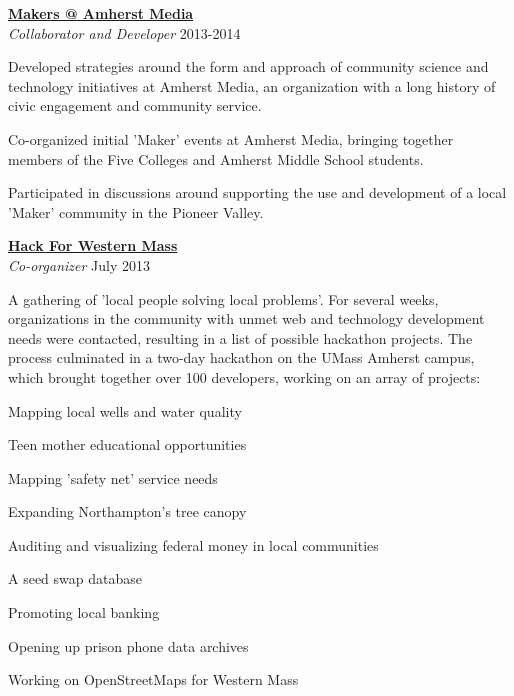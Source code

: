 \documentclass[10pt]{article}
\newcommand{\blankline}{\quad\pagebreak[3]}
\newcommand{\halfblankline}{\quad\vspace{-0.5\baselineskip}\pagebreak[3]}
\begin{document}
\blankline


\href{http://www.amherstmedia.org/makers}{\textbf{Makers @ Amherst Media}}\\
\emph{Collaborator and Developer} \hfill {2013-2014}

\halfblankline

\begin{innerlist}
\item Developed strategies around the form and approach of community science and technology initiatives at Amherst Media, an organization with a long history of civic engagement and community service. 
\item Co-organized initial 'Maker' events at Amherst Media, bringing together members of the Five Colleges and Amherst Middle School students.
\item Participated in discussions around supporting the use and development of a local 'Maker' community in the Pioneer Valley.
\end{innerlist}  

\blankline


\href{http://hackforwesternmass.org/}{\textbf{Hack For Western Mass}} \\
\emph{Co-organizer} \hfill {July 2013} 

\halfblankline

A gathering of 'local people solving local problems'. For several weeks, organizations in the community with unmet web and technology development needs were contacted, resulting in a list of possible hackathon projects.  The process culminated in a two-day hackathon on the UMass Amherst campus, which brought together over 100 developers, working on an array of projects:
    \begin{innerlist}
        \item Mapping local wells and water quality
\item Teen mother educational opportunities
\item Mapping 'safety net' service needs
\item Expanding Northampton's tree canopy
\item Auditing and visualizing federal money in local communities
\item A seed swap database
\item Promoting local banking
\item Opening up prison phone data archives
\item Working on OpenStreetMaps for Western Mass
\end{innerlist}
\end{document}
